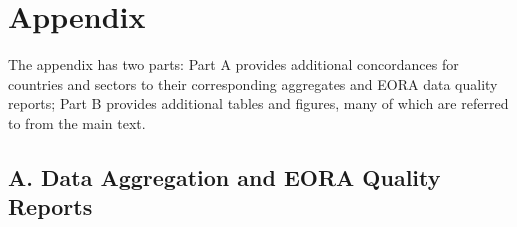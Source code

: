 \documentclass[a4paper]{article}
\begin{document}
\newpage




\newpage
\section*{Appendix}

The appendix has two parts: Part A provides additional concordances for countries and sectors to their corresponding aggregates and EORA data quality reports; Part B provides additional tables and figures, many of which are referred to from the main text. 


\subsection*{A. Data Aggregation and EORA Quality Reports}
\setcounter{table}{0}
\renewcommand{\thetable}{A\arabic{table}}
\setcounter{figure}{0}
\renewcommand{\thefigure}{A\arabic{figure}}
\end{document}
